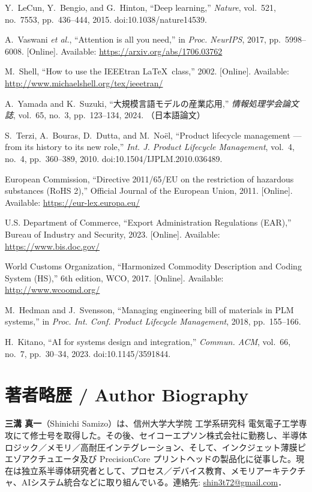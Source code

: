 \documentclass[10pt,conference]{IEEEtran}
\begin{document}
\begin{thebibliography}{00}

Y.~LeCun, Y.~Bengio, and G.~Hinton, ``Deep learning,'' \emph{Nature}, vol.~521,
no.~7553, pp.~436--444, 2015. doi:10.1038/nature14539.

A.~Vaswani \emph{et al.}, ``Attention is all you need,'' in \emph{Proc. NeurIPS},
2017, pp.~5998--6008. [Online]. Available: \url{https://arxiv.org/abs/1706.03762}

M.~Shell, ``How to use the {IEEEtran} \LaTeX\ class,'' 2002. [Online]. Available:
\url{http://www.michaelshell.org/tex/ieeetran/}

A.~Yamada and K.~Suzuki, ``大規模言語モデルの産業応用,'' \emph{情報処理学会論文誌}, vol.~65,
no.~3, pp.~123--134, 2024. （日本語論文）

S.~Terzi, A.~Bouras, D.~Dutta, and M.~Noël, ``Product lifecycle management — from its history to its new role,'' 
\emph{Int. J. Product Lifecycle Management}, vol.~4, no.~4, pp.~360--389, 2010. doi:10.1504/IJPLM.2010.036489.

European Commission, ``Directive 2011/65/EU on the restriction of hazardous substances (RoHS 2),'' 
Official Journal of the European Union, 2011. [Online]. Available: \url{https://eur-lex.europa.eu/}

U.S. Department of Commerce, ``Export Administration Regulations (EAR),'' 
Bureau of Industry and Security, 2023. [Online]. Available: \url{https://www.bis.doc.gov/}

World Customs Organization, ``Harmonized Commodity Description and Coding System (HS),'' 
6th edition, WCO, 2017. [Online]. Available: \url{http://www.wcoomd.org/}

M.~Hedman and J.~Svensson, ``Managing engineering bill of materials in PLM systems,'' 
in \emph{Proc. Int. Conf. Product Lifecycle Management}, 2018, pp.~155--166.

H.~Kitano, ``AI for systems design and integration,'' \emph{Commun. ACM}, vol.~66, no.~7, pp.~30--34, 2023. doi:10.1145/3591844.

\end{thebibliography}

\section*{著者略歴 / Author Biography}
\noindent\textbf{三溝 真一}（Shinichi Samizo）は、信州大学大学院 工学系研究科 電気電子工学専攻にて修士号を取得した。その後、セイコーエプソン株式会社に勤務し、半導体ロジック／メモリ／高耐圧インテグレーション、そして、インクジェット薄膜ピエゾアクチュエータ及び PrecisionCore プリントヘッドの製品化に従事した。現在は独立系半導体研究者として、プロセス／デバイス教育、メモリアーキテクチャ、AIシステム統合などに取り組んでいる。連絡先: \href{mailto:shin3t72@gmail.com}{shin3t72@gmail.com}．
\end{document}
